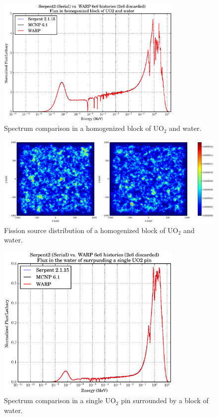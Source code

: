 \begin{figure}[h!] 
\centering
\includegraphics[width=0.8\textwidth]{graphics/finalresults/homfuel_spec.eps}
\caption{Spectrum comparison in a homogenized block of UO$_2$ and water. \label{homfuel_spec} }
\end{figure}

\begin{figure}[h!]
\centering
\includegraphics[width=\textwidth]{graphics/finalresults/homfuel_fiss.eps}
\caption{Fission source distribution of a homogenized block of UO$_2$ and water. \label{homfuel_fiss} }
\end{figure}

\begin{figure}[h!] 
\centering
\includegraphics[width=0.8\textwidth]{graphics/finalresults/pincell_spec.eps}
\caption{Spectrum comparison in a single UO$_2$ pin surrounded by a block of water. \label{pincell_spec} }
\end{figure}

